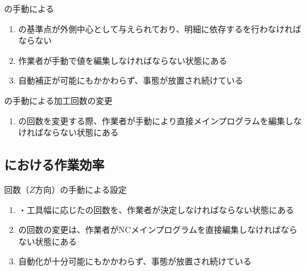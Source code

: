 \begin{Issues}{\EndFacecutMilling の手動による\TDCorrection}
\begin{enumerate}[label=\sarrow]
\item[{\sarrow[red]}]\EndFacecutMilling の基準点が外側中心として与えられており、明細に依存する\indexTDFaceMill\nameTDCorrection を行わなければならない
\item[{\sarrow[red]}]作業者が手動で\indexTDFaceMill\nameTDCorrection 値を編集しなければならない状態にある
\item[{\sarrow[red]}]自動補正が可能にもかかわらず、事態が放置され続けている
\end{enumerate}
\end{Issues}

\begin{Issues}{\EndFacecutMilling の手動による加工回数の変更}
\begin{enumerate}[label=\sarrow]
\item[{\sarrow[red]}]\EndFacecutMilling の回数を変更する際、作業者が手動により直接メインプログラムを編集しなければならない状態にある
\end{enumerate}
\end{Issues}


\subsection{\KeywayMilling における作業効率}

\begin{Issues}{\KeywayMilling 回数（$Z$方向）の手動による設定}
\begin{enumerate}[label=\sarrow]
\item[{\sarrow[red]}]\KeywayWidth・工具幅に応じた\KeywayMilling の回数を、作業者が決定しなければならない状態にある
\item[{\sarrow[red]}]\KeywayMilling の回数の変更は、作業者がNCメインプログラムを直接編集しなければならない状態にある
\item[{\sarrow[red]}]自動化が十分可能にもかかわらず、事態が放置され続けている
\end{enumerate}
\end{Issues}


